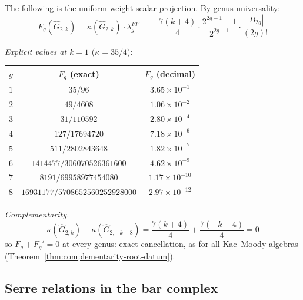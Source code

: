\begin{computation}
\label{comp:G2-genus}
The following is the uniform-weight scalar projection. By genus
universality:
\begin{equation}
F_g(\widehat{G}_{2,k}) = \kappa(\widehat{G}_{2,k}) \cdot \lambda_g^{FP} \quad = \frac{7(k+4)}{4} \cdot
\frac{2^{2g-1}-1}{2^{2g-1}} \cdot \frac{|B_{2g}|}{(2g)!}
\end{equation}

\emph{Explicit values at $k = 1$} ($\kappa = 35/4$):
\begin{center}
\renewcommand{\arraystretch}{1.4}
\begin{tabular}{c|c|c}
$g$ & $F_g$ (exact) & $F_g$ (decimal) \\
\hline
$1$ & $35/96$ & $3.65 \times 10^{-1}$ \\
$2$ & $49/4608$ & $1.06 \times 10^{-2}$ \\
$3$ & $31/110592$ & $2.80 \times 10^{-4}$ \\
$4$ & $127/17694720$ & $7.18 \times 10^{-6}$ \\
$5$ & $511/2802843648$ & $1.82 \times 10^{-7}$ \\
$6$ & $1414477/306070526361600$ & $4.62 \times 10^{-9}$ \\
$7$ & $8191/69958977454080$ & $1.17 \times 10^{-10}$ \\
$8$ & $16931177/5708652560252928000$ & $2.97 \times 10^{-12}$
\end{tabular}
\end{center}

\emph{Complementarity.}
\begin{equation}
\kappa(\widehat{G}_{2,k}) + \kappa(\widehat{G}_{2,-k-8})
= \frac{7(k+4)}{4} + \frac{7(-k-4)}{4} = 0
\end{equation}
so $F_g + F_g' = 0$ at every genus: exact cancellation, as for all
Kac--Moody algebras
(Theorem~\ref{thm:complementarity-root-datum}).
\end{computation}

\subsection{Serre relations in the bar complex}

